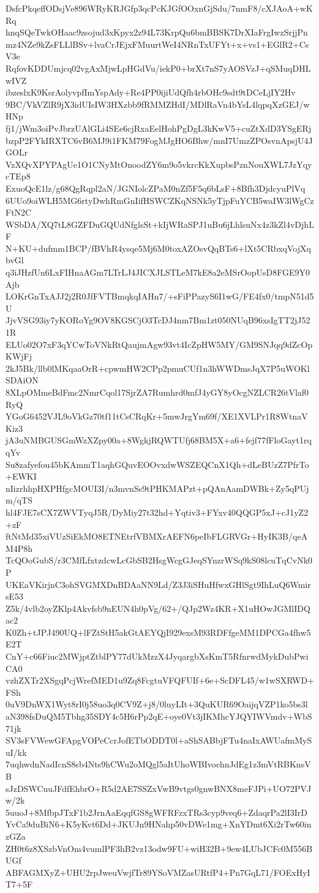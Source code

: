 DsfcPkqeffODsjVe896WRyKRJGfp3qcPcKJGfOOxnGjSdu/7nmF8/cXJAoA+wKRq
hnqSQeTwkOHaac9zsojud3xKpyx2z94L73KrpQu6bmBBSK7DrXIaFrgIwzSrjjPn
mz4NZe9kZsFLLlBSv+lvaCrJEjxFMuurtWeI4NRnTxUFYt+x+vs1+EGlR2+CsV3e
RqfovKDDUmjcq02vgAxMjwLpHGdVu/iekP0+brXt7nS7yAOSVzJ+qSMuqDHLwIVZ
ibzeslxK9KsrAolyvpfImYspAdy+Re4PP0ijiUdQfh4rbOHc9sdt9tDCeLjIY2Hv
9BC/VkVZlR9jX3idUIsIW3HXzbb9fRMMZHdI/MDlRaVn4bYsL4lqpqXzGEJ/wHNp
fj1/jWm3oiPvJbrzUAlGLi4SEe6cjRxaEelHohPgDgL3kKwV5+cuZtXdD3YSgERj
bzpP2FYkIRXTC6vB6MJ9i1FKM79FogMJgHO6Bhw/mnI7UmzZPOsvnApsjU4JGOLr
VzXQvXPYPAgUe1O1CNyMtOnoodZY6m9o5vkrcKkXupbsPznNouXWL7JzYqycTEp8
ExuoQcE1lz/g68QgRqpl2aN/JGNIolcZPaM0nZf5F5q6bLsF+8Bfh3DjdcyuPlVq
6UUo9oiWLH5MG6rtyDwhRmGnIifHSWCZKqNSNk5yTjpFuYCB5waIW3lWgCzFtN2C
WSbDA/XQ7tL8GZFDuGQUdNfglsSt+kIjWRaSPJ1uBu6jLhlsuNx4z3kZl4vDjhLF
N+KU+dufmm1BCP/fBVhR4ysqe5Mj6M0toxAZOsvQqBTs6+lXt5CRbxqVojXqbvGl
q3iJHzfUn6LxFIHnaAGm7LTrLJ4JICXJLSTLeM7kE8a2eMSrOopUsD8FGE9Y0Ajb
LOKrGnTxAJJ2j2R0JfFVTBmqkqIAHn7/+sFiPPazyS6I1wG/FE4fx0/tmpN51d5U
JjvVSG93iy7yKORoYg9OV8KGSCjO3TcDJ4nm7Bm1zt050NUqB96xsIgTT2jJ521R
ELUo02O7xF3qYCwToVNkRtQaujmAgw93vt4IcZpHW5MY/GM9SNJqq9dZcOpKWjFj
2kJ5Bk/llb0lMKqaaOrR+cpwmHW2CPp2pmuCUf1n3hWWDmsJqX7P5uWOKlSDAiON
8XLpOMmeBdFmc2NmrCqol17SjrZA7Rumhrd0mfJ4yGY8yOcgNZLCR26tVlaf0RyQ
YGoG6452VJL9oVkGz70tf11tCsCRqKr+5mwJrgYm69f/XE1XVLPr1R8WtnaVKiz3
jA3uNMBGUSGmWzXZpy00a+8WgkjRQWTUfj68BM5X+a6+fejf77fFloGayt1rqqYv
Su8zafyefou45bKAmmT1aqhGQuvEOOvxdwWSZEQCnX1Qh+dLeBUzZ7PfrTo+EWKI
nIizrhhpHXPHfgcMOUI3I/n3mvnSs9tPHKMAPzt+pQAnAamDWBk+Zy5qPUjm/qTS
hl4FJE7sCX7ZWVTyqJ5R/DyMiy27t32hd+Yqtiv3+FYxv40QQGP5xJ+cJ1yZ2+zF
ftNtMd35xiVUzSiEkMO8ETNEtrfVBMXrAEFN6peIbFLGRVGr+HyIK3B/qeAM4P8h
TcQOoGubS/r3CMfLfxtzdcwLcGbSB2HsgWcgGJeqSYnzrWSq9kS08lcuTqCvNk0P
UKEaVKirjnC3ohSVGMXDnBDAaNN9Ld/Z3J3iSHuHfwxGHlSgt9IhLuQ6WmirsE53
Z5k/4vlb2oyZKlp4Akvfsb9nEUN4h0pVg/62+/QJp2Wz4KR+X1uHOwJGMlIDQac2
K0Zh+tJPJ490UQ+lFZtStH5akGtAEYQjI929exsM93RDFfgeMM1DPCGa4fhw5E2T
CnY+c66Fiuc2MWjptZtblPY77dUkMzzX4JyqargbXsKmT5RfnrwdMykDubPwiCA0
vzhZXTr2XSgqPcjWrefMED1u9Zq8FcgtuVFQFUIf+6e+ScDFL45/w1wSXRWD+FSh
0uV9DnWX1Wyt8rI0j58uo3q0CV9Z+j8/0luyLIt+3QuKUR69OaijqVZP1ko5bs3l
aN398fsDuQM5Tbhg35SDY4c5H6rPp2qE+oye0Vt3jIKMhcYJQYIWVmdv+WbS71jk
SV3sFVWewGFApgVOPeCcrJofETbODDT0l+aShSABbjFTu4naIxAWUafmMySuI/kk
7uqhwdnNadIcnS8sb4Nts9hCWu2oMQgl5aItUhoWBIvochnJdEg1z3mVtRBKnsVB
sJzDSWCuuJFdfEhbrO+R5d2AE7SSZxVwB9vtgs0gnwBNX8meFJPi+UO72PVJw/2k
5uuoJ+8MfbpJTxF1b2JrnAaEqqfGS8gWFRFzxTRs3cyp9veq6+ZdaqrPa2lI3IrD
YvCa9duBiN6+K5yKvt6Dd+JKUJn9HNahp50vDWe1mg+XnYDmt6Xi2rTw60inzGZa
ZH0t6z8XSzbVnOm4vumlPF3hB2vz13odw9FU+wiH32B+9ew4LUbJCFc0M556BUGf
ABFAGMXyZ+UHU2rpJweuVwjfTr89YSoVMZasURtfP4+Pn7GqL71/FOExHyIT7+5F
